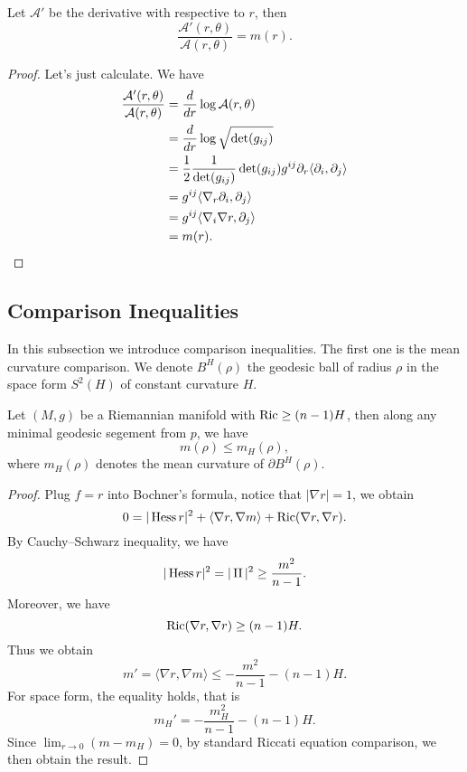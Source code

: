 \begin{lem}\label{lem:mean curv and A}
    Let $\mathcal{A}'$ be the derivative with respective to $r$, then
    \[\frac{\mathcal{A}'(r,\theta)}{\mathcal{A}(r,\theta)}=m(r).\]
\end{lem}
\begin{proof}
    Let's just calculate.
    We have
    \begin{align*}
        \frac{\mathcal{A}'(r,\theta)}{\mathcal{A}(r,\theta)}&=\frac{d}{dr}\log{\mathcal{A}(r,\theta)}\\
        &=\frac{d}{dr}\log{\sqrt{\det(g_{ij})}}\\
        &=\frac{1}{2}\frac{1}{\det(g_{ij})}\det(g_{ij})g^{ij}\partial_r\langle\partial_i,\partial_j\rangle\\
        &=g^{ij}\langle\nabla_r\partial_i,\partial_j\rangle\\
        &=g^{ij}\langle\nabla_i\nabla r,\partial_j\rangle\\
        &=m(r).\qedhere
    \end{align*}
\end{proof}

\subsection{Comparison Inequalities}

In this subsection we introduce comparison inequalities.
The first one is the mean curvature comparison.
We denote $B^H(\rho)$ the geodesic ball of radius $\rho$ in the space form $S^2(H)$ of constant curvature $H$.

\begin{thm}\label{thm:mean comparison}
    Let $(M,g)$ be a Riemannian manifold with $\operatorname{Ric}\geq(n-1)H$, then along any minimal geodesic segement from $p$, we have
    \[m(\rho)\leq m_H(\rho),\]
    where $m_H(\rho)$ denotes the mean curvature of $\partial B^H(\rho)$.
\end{thm}
\begin{proof}
    Plug $f=r$ into Bochner's formula, notice that $|\nabla r|=1$, we obtain
    \[0=|\operatorname{Hess}{r}|^2+\langle\nabla r,\nabla m\rangle+\operatorname{Ric}(\nabla r,\nabla r).\]
    By Cauchy--Schwarz inequality, we have
    \[|\operatorname{Hess}{r}|^2=|\operatorname{II}|^2\geq\frac{m^2}{n-1}.\]
    Moreover, we have
    \[\operatorname{Ric}(\nabla r,\nabla r)\geq(n-1)H.\]
    Thus we obtain
    \[m'=\langle\nabla r,\nabla m\rangle\leq-\frac{m^2}{n-1}-(n-1)H.\]
    For space form, the equality holds, that is
    \[m_H'=-\frac{m^2_H}{n-1}-(n-1)H.\]
    Since $\lim_{r\to 0}(m-m_H)=0$, by standard Riccati equation comparison, we then obtain the result.
\end{proof}


